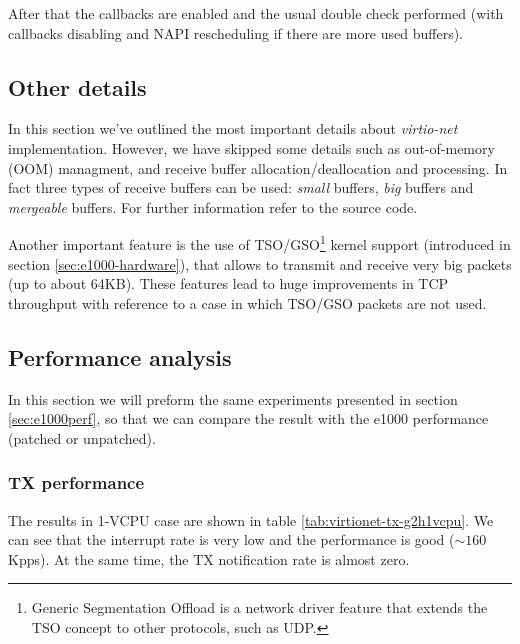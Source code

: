 After that the callbacks are enabled and the usual double check performed (with callbacks disabling and NAPI rescheduling if there are
more used buffers).


\subsection{Other details}
In this section we've outlined the most important details about \emph{virtio-net} implementation. However, we have skipped some details
such as out-of-memory (OOM) managment, and receive buffer allocation/deallocation and processing.
In fact three types of receive buffers can be used: \emph{small} buffers, \emph{big} buffers and \emph{mergeable} buffers. For further
information refer to the source code.

\vspace{0.5cm}

Another important feature is the use of TSO/GSO\footnote{Generic Segmentation Offload is a network driver feature that extends the TSO
concept to other protocols, such as UDP.} kernel support (introduced in section \ref{sec:e1000-hardware}), that allows to transmit
and receive very big packets (up to about 64KB). These features lead to huge improvements in TCP throughput with reference to a case in
which TSO/GSO packets are not used.


\subsection{Performance analysis}
In this section we will preform the same experiments presented in section \ref{sec:e1000perf}, so that we can compare the result with
the e1000 performance (patched or unpatched).

\subsubsection{TX performance}
\label{sec:virtionet-perf-tx}
The results in 1-VCPU case are shown in table \ref{tab:virtionet-tx-g2h1vcpu}. We can see that the interrupt rate is very low and the
performance is good ($\sim 160$ Kpps). At the same time, the TX notification rate is almost zero. 


